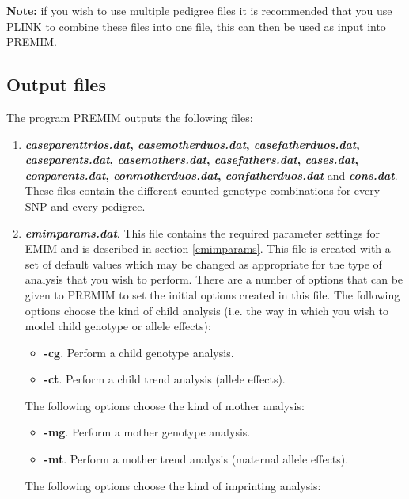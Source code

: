 \documentclass[a4paper,12pt]{article}
\begin{document}
{\bf Note:} if you wish to use multiple pedigree files it is recommended that you use PLINK to combine these files into one file, this can then be used as input into PREMIM. 


\subsection{Output files}
\label{premim-output}

The program PREMIM outputs the following files: 
\begin{enumerate}

\item {\bf {\it caseparenttrios.dat}, {\it casemotherduos.dat}, {\it casefatherduos.dat}, {\it caseparents.dat}, {\it casemothers.dat}, {\it casefathers.dat}, {\it cases.dat}, {\it conparents.dat}, {\it conmotherduos.dat}, {\it confatherduos.dat}} and {\bf {\it cons.dat}}. These files contain the different counted genotype combinations for every SNP and every pedigree. 
\item {\bf {\it emimparams.dat}}. This file contains the required parameter settings for EMIM and is described in  section \ref{emimparams}. This file is created with a set of default values which may be changed as appropriate for the type of analysis that you wish to perform. There are a number of options that can be given to PREMIM to set the initial options created in this file. The following options choose the kind of child analysis (i.e. the way in which you wish to model child genotype or allele effects): \begin{itemize}

\item {\bf -cg}. Perform a child genotype analysis. 
\item {\bf -ct}. Perform a child trend analysis (allele effects).\end{itemize}
The following options choose the kind of mother analysis: \begin{itemize}

\item {\bf -mg}. Perform a mother genotype analysis. 
\item {\bf -mt}. Perform a mother trend analysis (maternal allele effects).\end{itemize}
The following options choose the kind of imprinting analysis: \begin{itemize}


\end{itemize}
\end{enumerate}
\end{document}
